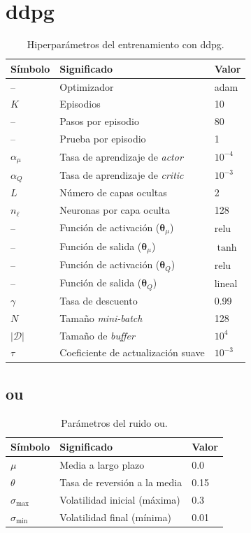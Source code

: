 \section{\acrshort{ddpg}}
\begin{table}[H]
\centering
\caption{Hiperparámetros del entrenamiento con \acrshort{ddpg}.}
\begin{tabular}{|l|l|l|}
\hline
\textbf{Símbolo} & \textbf{Significado} & \textbf{Valor} \\ \hline
– & Optimizador & \acrshort{adam}  \\ \hline
$K$ & Episodios & 10  \\ \hline
– & Pasos por episodio & 80  \\ \hline
– & Prueba por episodio & 1 \\ \hline
$\alpha_{\mu}$ & Tasa de aprendizaje de \textit{actor} & $10^{-4}$ \\ \hline
$\alpha_{Q}$ & Tasa de aprendizaje de \textit{critic} & $10^{-3}$ \\ \hline
$L$ & Número de capas ocultas & 2 \\ \hline
$n_{\ell}$ & Neuronas por capa oculta & 128 \\ \hline 
– & Función de activación ($\bm\theta_{\mu}$)& \acrshort{relu} \\ \hline
– & Función de salida ($\bm\theta_{\mu}$) & $\tanh$ \\ \hline 
– & Función de activación ($\bm\theta_{Q}$)& \acrshort{relu} \\ \hline
– & Función de salida ($\bm\theta_{Q}$) & lineal \\ \hline
$\gamma$ & Tasa de descuento & 0.99 \\ \hline
$N$ & Tamaño \textit{mini-batch} & 128 \\ \hline
$|\mathcal{D}|$ & Tamaño de \textit{buffer} & $10^{4}$ \\ \hline
$\tau$ & Coeficiente de actualización suave & $10^{-3}$ \\ \hline
\end{tabular}
\end{table}

\subsection{\acrshort{ou}}
\label{tab:ou_noise}
\begin{table}[H]
\centering
\caption{Parámetros del ruido \acrshort{ou}.}
\begin{tabular}{|l|l|l|}
\hline
\textbf{Símbolo} & \textbf{Significado} & \textbf{Valor} \\\hline
$\mu$ & Media a largo plazo & 0.0 \\ \hline
$\theta$ & Tasa de reversión a la media & 0.15 \\ \hline
$\sigma_{\text{max}}$ & Volatilidad inicial (máxima) & 0.3 \\ \hline
$\sigma_{\text{min}}$ & Volatilidad final (mínima) & 0.01 \\ \hline
\end{tabular}
\end{table}

